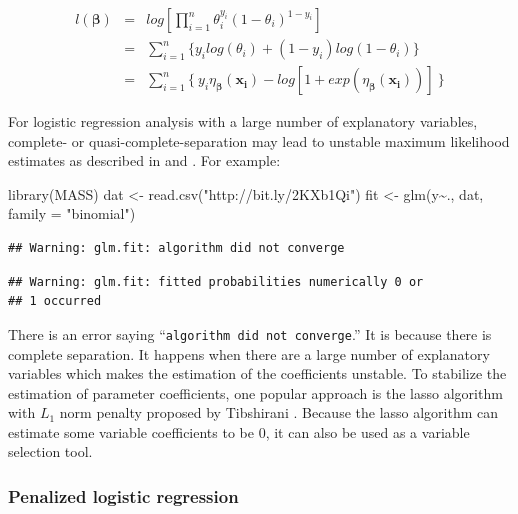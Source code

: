\documentclass[
  12pt,
]{krantz}
\makeatletter
\newenvironment{Shaded}{\begin{snugshade}}{\end{snugshade}}
\newcommand{\AttributeTok}[1]{\textcolor[rgb]{0.61,0.61,0.61}{#1}}
\newcommand{\FunctionTok}[1]{\textcolor[rgb]{0,0,0}{#1}}
\newcommand{\NormalTok}[1]{#1}
\newcommand{\OtherTok}[1]{\textcolor[rgb]{0.37,0.37,0.37}{#1}}
\newcommand{\SpecialCharTok}[1]{\textcolor[rgb]{0,0,0}{#1}}
\newcommand{\StringTok}[1]{\textcolor[rgb]{0.5,0.5,0.5}{#1}}
\newenvironment{kframe}{%
\medskip{}
\setlength{\fboxsep}{.8em}
 \def\at@end@of@kframe{}%
 \ifinner\ifhmode%
  \def\at@end@of@kframe{\end{minipage}}%
  \begin{minipage}{\columnwidth}%
 \fi\fi%
 \def\FrameCommand##1{\hskip\@totalleftmargin \hskip-\fboxsep
 \colorbox{shadecolor}{##1}\hskip-\fboxsep
     \hskip-\linewidth \hskip-\@totalleftmargin \hskip\columnwidth}%
 \MakeFramed {\advance\hsize-\width
   \@totalleftmargin\z@ \linewidth\hsize
   \@setminipage}}%
 {\par\unskip\endMakeFramed%
 \at@end@of@kframe}
\renewenvironment{Shaded}{\begin{kframe}}{\end{kframe}}
\makeatother
\begin{document}
\begin{eqnarray*}
l(\symbf{\beta})&=&log[\prod_{i=1}^{n}\theta_{i}^{y_{i}}(1-\theta_{i})^{1-y_{i}}]\\
&=&\sum_{i=1}^{n}\{y_{i}log(\theta_{i})+(1-y_{i})log(1-\theta_{i})\}\\
&=&\sum_{i=1}^{n}\{\ y_{i}\eta_{\symbf{\beta}}(\mathbf{x_{i}})-log[1+exp(\eta_{\symbf{\beta}}(\mathbf{x_{i}}))]\ \}
\label{eq:logisticlikelihood}
\end{eqnarray*}

For logistic regression analysis with a large number of explanatory variables, complete- or quasi-complete-separation may lead to unstable maximum likelihood estimates as described in \citep{Wed1976} and \citep{albert1984}. For example:

\begin{Shaded}
\begin{Highlighting}[]
\FunctionTok{library}\NormalTok{(MASS)}
\NormalTok{dat }\OtherTok{\textless{}{-}} \FunctionTok{read.csv}\NormalTok{(}\StringTok{"http://bit.ly/2KXb1Qi"}\NormalTok{)}
\NormalTok{fit }\OtherTok{\textless{}{-}} \FunctionTok{glm}\NormalTok{(y}\SpecialCharTok{\textasciitilde{}}\NormalTok{., dat, }\AttributeTok{family =} \StringTok{"binomial"}\NormalTok{)}
\end{Highlighting}
\end{Shaded}

\begin{verbatim}
## Warning: glm.fit: algorithm did not converge
\end{verbatim}

\begin{verbatim}
## Warning: glm.fit: fitted probabilities numerically 0 or
## 1 occurred
\end{verbatim}

There is an error saying ``\texttt{algorithm\ did\ not\ converge}.'' It is because there is complete separation. It happens when there are a large number of explanatory variables which makes the estimation of the coefficients unstable. To stabilize the estimation of parameter coefficients, one popular approach is the lasso algorithm with \(L_1\) norm penalty proposed by Tibshirani \citep{Tibshirani1996}. Because the lasso algorithm can estimate some variable coefficients to be 0, it can also be used as a variable selection tool.

\hypertarget{penalized-logistic-regression-1}{%
\subsubsection{Penalized logistic regression}\label{penalized-logistic-regression-1}}
\end{document}
